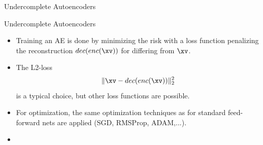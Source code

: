 \documentclass[11pt,compress,t,notes=noshow, xcolor=table]{beamer}
\begin{document}
\begin{frame}{Undercomplete Autoencoders}
  
\end{frame}

\begin{vbframe}{Undercomplete Autoencoders}

  \begin{itemize}
    \item %
    Training an AE is done by minimizing the risk with a loss function penalizing the reconstruction  $dec(enc(\xv))$ for differing from $\xv$. 
    \item The L2-loss 
    $$
    \|\xv - dec(enc(\xv))\|^2_2
    $$
    is a typical choice, but other loss functions are possible. 
    \item For optimization, the same optimization techniques as for standard feed-forward nets are applied (SGD, RMSProp, ADAM,...).
    \item[]
  \end{itemize}

\end{vbframe}
\end{document}
